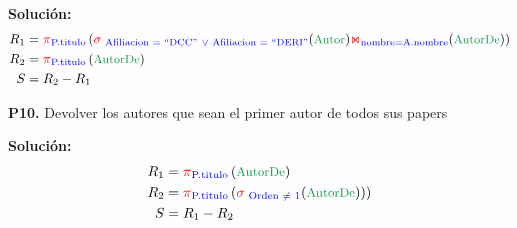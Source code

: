 \documentclass[letterpaper,11pt]{article}
\begin{document}
\textbf{Solución:}
{\large
\begin{align*}
 R_1 &= \textcolor{red}{\pi}_{\textcolor{blue}{\textrm{P.titulo}}} \left(\textcolor{red}{\sigma}_{\textcolor{blue}{\textrm{\ Afiliacion = “DCC”}\ \vee \textrm{\ Afiliacion = “DERI”}}} (\textcolor{ForestGreen}{\textrm{\small Autor}}) {\textcolor{red}{\Join}}_{\textcolor{blue}{\textrm{nombre=A.nombre}}} (\textcolor{ForestGreen}{\textrm{\small AutorDe}})  \right) \\
 R_2 &= \textcolor{red}{\pi}_{\textcolor{blue}{\textrm{P.titulo}}} \left( \textcolor{ForestGreen}{\textrm{{\small AutorDe}}} \right) \\
 S &= R_2 - R_1
\end{align*}
}

\textbf{P10.} Devolver los autores que sean el primer autor de todos sus papers

\textbf{Solución:}
{\large
\begin{align*}
 R_1 &= \textcolor{red}{\pi}_{\textcolor{blue}{\textrm{P.titulo}}} \left( \textrm{{\small \textcolor{ForestGreen}{AutorDe}}} \right)  \\
 R_2 &= \textcolor{red}{\pi}_{\textcolor{blue}{\textrm{P.titulo}}} \left(\textcolor{red}{\sigma}_{\textcolor{blue}{\textrm{\  Orden $\neq$ 1}} } (\textrm{\small \textcolor{ForestGreen}{AutorDe}}) )  \right)\\
 S &= R_1 - R_2
\end{align*}
}
\end{document}
